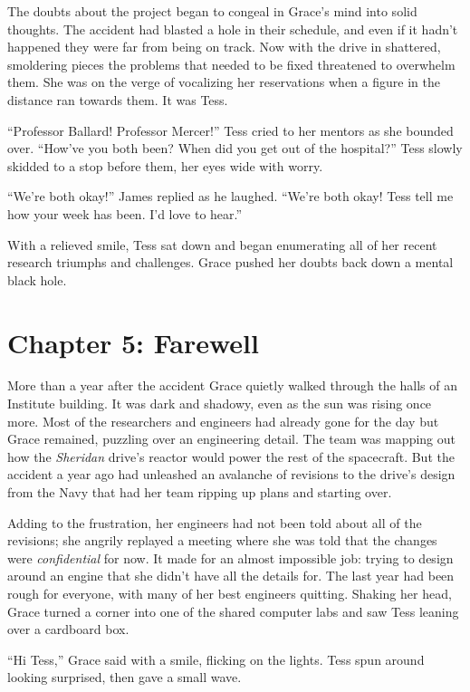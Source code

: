 \documentclass[12pt]{article} %
\begin{document}
The doubts about the project began to congeal in Grace's mind into solid thoughts. The accident had blasted a hole in their schedule, and even if it hadn't happened they were far from being on track. Now with the drive in shattered, smoldering pieces the problems that needed to be fixed threatened to overwhelm them. She was on the verge of vocalizing her reservations when a figure in the distance ran towards them. It was Tess.

``Professor Ballard! Professor Mercer!'' Tess cried to her mentors as she bounded over. ``How've you both been? When did you get out of the hospital?'' Tess slowly skidded to a stop before them, her eyes wide with worry.

``We're both okay!'' James replied as he laughed. ``We're both okay! Tess tell me how your week has been. I'd love to hear.''

With a relieved smile, Tess sat down and began enumerating all of her recent research triumphs and challenges. Grace pushed her doubts back down a mental black hole.

\newpage
\section{Chapter 5: Farewell}

More than a year after the accident Grace quietly walked through the halls of an Institute building. It was dark and shadowy, even as the sun was rising once more. Most of the researchers and engineers had already gone for the day but Grace remained, puzzling over an engineering detail. The team was mapping out how the \textit{Sheridan} drive's reactor would power the rest of the spacecraft. But the accident a year ago had unleashed an avalanche of revisions to the drive's design from the Navy that had her team ripping up plans and starting over. 

Adding to the frustration, her engineers had not been told about all of the revisions; she angrily replayed a meeting where she was told that the changes were \textit{confidential} for now. It made for an almost impossible job: trying to design around an engine that she didn't have all the details for. The last year had been rough for everyone, with many of her best engineers quitting. Shaking her head, Grace turned a corner into one of the shared computer labs and saw Tess leaning over a cardboard box.

``Hi Tess,'' Grace said with a smile, flicking on the lights. Tess spun around looking surprised, then gave a small wave. 
\end{document}
